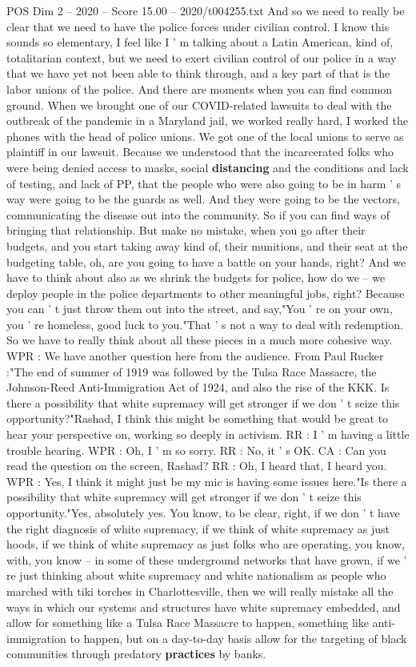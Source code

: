 \begin{textsample}{POS Dim 2 – 2020 – Score 15.00 – 2020/t004255.txt}
And so we need to really be clear that we need to have the police forces under civilian control.
I know this sounds so elementary, I feel like I ' m talking about a Latin American, kind of, totalitarian context, but we need to exert civilian control of our police in a way that we have yet not been able to think through, and a key part of that is the labor unions of the police.
And there are moments when you can find common ground.
When we brought one of our COVID-related lawsuits to deal with the outbreak of the pandemic in a Maryland jail, we worked really hard, I worked the phones with the head of police unions.
We got one of the local unions to serve as plaintiff in our lawsuit.
Because we understood that the incarcerated folks who were being denied access to masks, social \textbf{distancing} and the conditions and lack of testing, and lack of PP, that the people who were also going to be in harm ' s way were going to be the guards as well.
And they were going to be the vectors, communicating the disease out into the community.
So if you can find ways of bringing that relationship.
But make no mistake, when you go after their budgets, and you start taking away kind of, their munitions, and their seat at the budgeting table, oh, are you going to have a battle on your hands, right?
And we have to think about also as we shrink the budgets for police, how do we -- we deploy people in the police departments to other meaningful jobs, right?
Because you can ' t just throw them out into the street, and say,"You ' re on your own, you ' re homeless, good luck to you."That ' s not a way to deal with redemption.
So we have to really think about all these pieces in a much more cohesive way.
WPR : We have another question here from the audience.
From Paul Rucker :"The end of summer of 1919 was followed by the Tulsa Race Massacre, the Johnson-Reed Anti-Immigration Act of 1924, and also the rise of the KKK.
Is there a possibility that white supremacy will get stronger if we don ' t seize this opportunity?"Rashad, I think this might be something that would be great to hear your perspective on, working so deeply in activism.
RR : I ' m having a little trouble hearing.
WPR : Oh, I ' m so sorry.
RR : No, it ' s OK.
CA : Can you read the question on the screen, Rashad?
RR : Oh, I heard that, I heard you.
WPR : Yes, I think it might just be my mic is having some issues here."Is there a possibility that white supremacy will get stronger if we don ' t seize this opportunity."Yes, absolutely yes.
You know, to be clear, right, if we don ' t have the right diagnosis of white supremacy, if we think of white supremacy as just hoods, if we think of white supremacy as just folks who are operating, you know, with, you know -- in some of these underground networks that have grown, if we ' re just thinking about white supremacy and white nationalism as people who marched with tiki torches in Charlottesville, then we will really mistake all the ways in which our systems and structures have white supremacy embedded, and allow for something like a Tulsa Race Massacre to happen, something like anti-immigration to happen, but on a day-to-day basis allow for the targeting of black communities through predatory \textbf{practices} by banks.

\end{textsample}
